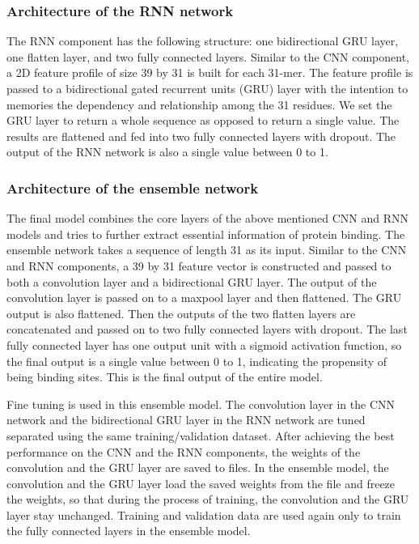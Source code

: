 \documentclass{bioinfo}
\begin{document}
\begin{methods}
\subsubsection{Architecture of the RNN network}
The RNN component has the following structure: one bidirectional GRU layer, one flatten layer, and two fully connected layers. Similar to the CNN component, a 2D feature profile of size 39 by 31 is built for each 31-mer. The feature profile is passed to a bidirectional gated recurrent units (GRU) layer with the intention to memories the dependency and relationship among the 31 residues. We set the GRU layer to return a whole sequence as opposed to return a single value. The results are flattened and fed into two fully connected layers with dropout. The output of the RNN network is also a single value between 0 to 1.

\subsubsection{Architecture of the ensemble network}
The final model combines the core layers of the above mentioned CNN and RNN models and tries to further extract essential information of protein binding. The ensemble network takes a sequence of length 31 as its input. Similar to the CNN and RNN components, a 39 by 31 feature vector is constructed and passed to both a convolution layer and a bidirectional GRU layer. The output of the convolution layer is passed on to a maxpool layer and then flattened. The GRU output is also flattened. Then the outputs of the two flatten layers are concatenated and passed on to two fully connected layers with dropout. The last fully connected layer has one output unit with a sigmoid activation function, so the final output is a single value between 0 to 1, indicating the propensity of being binding sites. This is the final output of the entire model. 

Fine tuning is used in this ensemble model. The convolution layer in the CNN network and the bidirectional GRU layer in the RNN network are tuned separated using the same training/validation dataset. After achieving the best performance on the CNN and the RNN components, the weights of the convolution and the GRU layer are saved to files. In the ensemble model, the convolution and the GRU layer load the saved weights from the file and freeze the weights, so that during the process of training, the convolution and the GRU layer stay unchanged. Training and validation data are used again only to train the fully connected layers in the ensemble model.


\end{methods}
\end{document}
